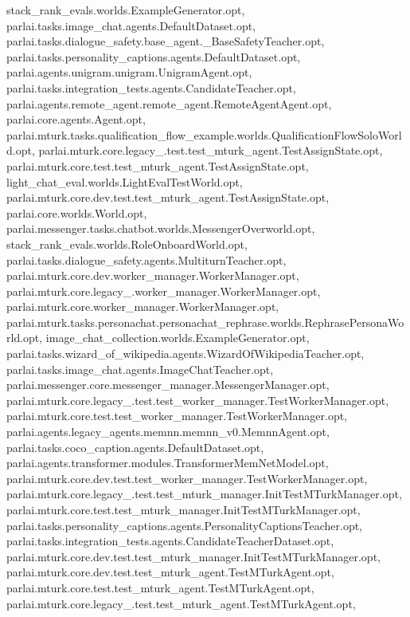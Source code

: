 stack\+\_\+rank\+\_\+evals.\+worlds.\+Example\+Generator.\+opt, parlai.\+tasks.\+image\+\_\+chat.\+agents.\+Default\+Dataset.\+opt, parlai.\+tasks.\+dialogue\+\_\+safety.\+base\+\_\+agent.\+\_\+\+Base\+Safety\+Teacher.\+opt, parlai.\+tasks.\+personality\+\_\+captions.\+agents.\+Default\+Dataset.\+opt, parlai.\+agents.\+unigram.\+unigram.\+Unigram\+Agent.\+opt, parlai.\+tasks.\+integration\+\_\+tests.\+agents.\+Candidate\+Teacher.\+opt, parlai.\+agents.\+remote\+\_\+agent.\+remote\+\_\+agent.\+Remote\+Agent\+Agent.\+opt, parlai.\+core.\+agents.\+Agent.\+opt, parlai.\+mturk.\+tasks.\+qualification\+\_\+flow\+\_\+example.\+worlds.\+Qualification\+Flow\+Solo\+World.\+opt, parlai.\+mturk.\+core.\+legacy\+\_.\+test.\+test\+\_\+mturk\+\_\+agent.\+Test\+Assign\+State.\+opt, parlai.\+mturk.\+core.\+test.\+test\+\_\+mturk\+\_\+agent.\+Test\+Assign\+State.\+opt, light\+\_\+chat\+\_\+eval.\+worlds.\+Light\+Eval\+Test\+World.\+opt, parlai.\+mturk.\+core.\+dev.\+test.\+test\+\_\+mturk\+\_\+agent.\+Test\+Assign\+State.\+opt, parlai.\+core.\+worlds.\+World.\+opt, parlai.\+messenger.\+tasks.\+chatbot.\+worlds.\+Messenger\+Overworld.\+opt, stack\+\_\+rank\+\_\+evals.\+worlds.\+Role\+Onboard\+World.\+opt, parlai.\+tasks.\+dialogue\+\_\+safety.\+agents.\+Multiturn\+Teacher.\+opt, parlai.\+mturk.\+core.\+dev.\+worker\+\_\+manager.\+Worker\+Manager.\+opt, parlai.\+mturk.\+core.\+legacy\+\_.\+worker\+\_\+manager.\+Worker\+Manager.\+opt, parlai.\+mturk.\+core.\+worker\+\_\+manager.\+Worker\+Manager.\+opt, parlai.\+mturk.\+tasks.\+personachat.\+personachat\+\_\+rephrase.\+worlds.\+Rephrase\+Persona\+World.\+opt, image\+\_\+chat\+\_\+collection.\+worlds.\+Example\+Generator.\+opt, parlai.\+tasks.\+wizard\+\_\+of\+\_\+wikipedia.\+agents.\+Wizard\+Of\+Wikipedia\+Teacher.\+opt, parlai.\+tasks.\+image\+\_\+chat.\+agents.\+Image\+Chat\+Teacher.\+opt, parlai.\+messenger.\+core.\+messenger\+\_\+manager.\+Messenger\+Manager.\+opt, parlai.\+mturk.\+core.\+legacy\+\_.\+test.\+test\+\_\+worker\+\_\+manager.\+Test\+Worker\+Manager.\+opt, parlai.\+mturk.\+core.\+test.\+test\+\_\+worker\+\_\+manager.\+Test\+Worker\+Manager.\+opt, parlai.\+agents.\+legacy\+\_\+agents.\+memnn.\+memnn\+\_\+v0.\+Memnn\+Agent.\+opt, parlai.\+tasks.\+coco\+\_\+caption.\+agents.\+Default\+Dataset.\+opt, parlai.\+agents.\+transformer.\+modules.\+Transformer\+Mem\+Net\+Model.\+opt, parlai.\+mturk.\+core.\+dev.\+test.\+test\+\_\+worker\+\_\+manager.\+Test\+Worker\+Manager.\+opt, parlai.\+mturk.\+core.\+legacy\+\_.\+test.\+test\+\_\+mturk\+\_\+manager.\+Init\+Test\+M\+Turk\+Manager.\+opt, parlai.\+mturk.\+core.\+test.\+test\+\_\+mturk\+\_\+manager.\+Init\+Test\+M\+Turk\+Manager.\+opt, parlai.\+tasks.\+personality\+\_\+captions.\+agents.\+Personality\+Captions\+Teacher.\+opt, parlai.\+tasks.\+integration\+\_\+tests.\+agents.\+Candidate\+Teacher\+Dataset.\+opt, parlai.\+mturk.\+core.\+dev.\+test.\+test\+\_\+mturk\+\_\+manager.\+Init\+Test\+M\+Turk\+Manager.\+opt, parlai.\+mturk.\+core.\+dev.\+test.\+test\+\_\+mturk\+\_\+agent.\+Test\+M\+Turk\+Agent.\+opt, parlai.\+mturk.\+core.\+test.\+test\+\_\+mturk\+\_\+agent.\+Test\+M\+Turk\+Agent.\+opt, parlai.\+mturk.\+core.\+legacy\+\_.\+test.\+test\+\_\+mturk\+\_\+agent.\+Test\+M\+Turk\+Agent.\+opt, 